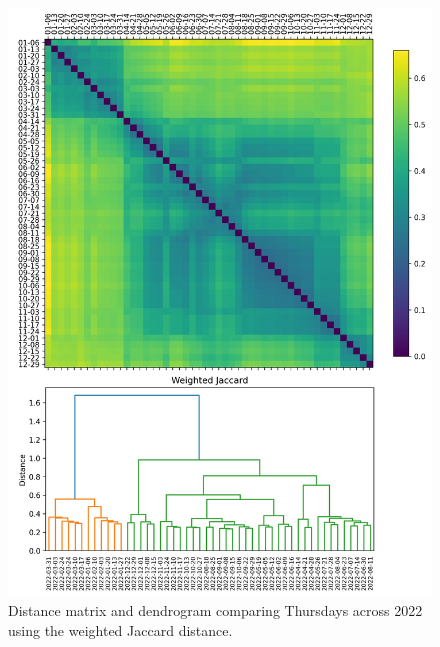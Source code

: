 \documentclass[../main.tex]{subfiles}
\begin{document}
\begin{figure}[ht]

\centering
\vspace{-30mm}
\begin{adjustbox}{center}
\includegraphics[width=1.3\textwidth]{graphics/results/Jaccard_Thu.png}
\end{adjustbox}
\caption{Distance matrix and dendrogram comparing Thursdays across 2022 using the weighted Jaccard distance.}
\label{fig:thu-Jaccard}
\end{figure}
\end{document}
